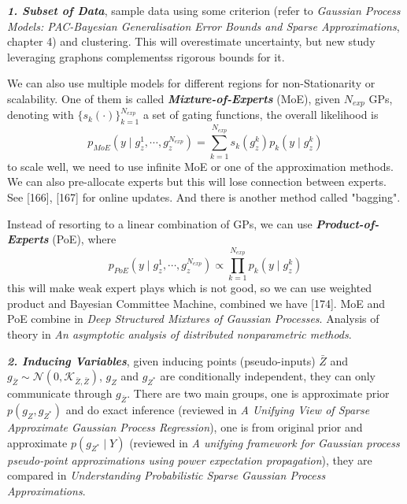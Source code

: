 \documentclass[10pt]{elegantbook}
\newcommand{\mydefination}[1]{\textbf{\textit{\textcolor{structurecolor}{#1}}}}
\begin{document}
\mydefination{1. Subset of Data}, sample data using some criterion (refer to \textit{Gaussian Process Models: PAC-Bayesian 
Generalisation Error Bounds and Sparse Approximations}, chapter 4) and clustering. This will overestimate uncertainty, but 
new study leveraging graphons complementss rigorous bounds for it. 

We can also use multiple models for different regions for non-Stationarity or scalability. One of them is called \mydefination{Mixture-of-Experts}
(MoE), given $N_{exp}$ GPs, denoting with $\{ s_k(\cdot) \}_{k=1}^{N_{exp}}$ a set of gating functions, the overall likelihood is
\[
p_{MoE}(y \mid g_z^1, \cdots, g_z^{N_{exp}}) = \sum_{k=1}^{N_{exp}} s_k(g_z^k)p_k(y \mid g_z^k)
\]
to scale well, we need to use infinite MoE or one of the approximation methods. We can also pre-allocate experts but this will
lose connection between experts. See [166], [167] for online updates. And there is another method called "bagging".

Instead of resorting to a linear combination of GPs, we can use \mydefination{Product-of-Experts} (PoE), where
\[
p_{PoE}(y \mid g_z^1, \cdots, g_z^{N_{exp}}) \propto \prod_{k=1}^{N_{exp}} p_k(y \mid g_z^k)
\]
this will make weak expert plays which is not good, so we can use weighted product and Bayesian Committee Machine, combined
we have [174]. MoE and PoE combine in \textit{Deep Structured Mixtures of Gaussian Processes}. Analysis of theory 
in \textit{An asymptotic analysis of distributed nonparametric methods}.

\mydefination{2. Inducing Variables}, given inducing points (pseudo-inputs) $\bar Z$ and $g_{\bar Z} \sim \mathcal N(0, \mathscr{K}_{\bar Z, \bar Z})$, 
$g_Z$ and $g_{Z^*}$ are conditionally independent, they can only communicate through $g_{\bar Z}$. There are two main groups,
one is approximate prior $p(g_Z, g_{Z^*})$ and do exact inference (reviewed in \textit{A Unifying View of Sparse Approximate Gaussian Process Regression}),
one is from original prior and approximate $p(g_{Z^*} \mid Y)$ (reviewed in \textit{A unifying framework for Gaussian process pseudo-point approximations using power expectation propagation}),
they are compared in \textit{Understanding Probabilistic Sparse Gaussian Process Approximations}.
\end{document}
